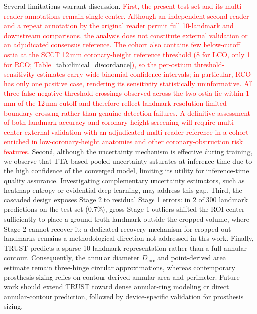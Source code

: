 \documentclass[conference]{IEEEtran}
\begin{document}
Several limitations warrant discussion. \textcolor{red}{First, the present test set and its multi-reader annotations remain single-center. Although an independent second reader and a repeat annotation by the original reader permit full 10-landmark and downstream comparisons, the analysis does not constitute external validation or an adjudicated consensus reference.} \textcolor{red}{The cohort also contains few below-cutoff ostia at the SCCT 12\,mm coronary-height reference threshold (8 for LCO, only 1 for RCO; Table~\ref{tab:clinical_discordance}), so the per-ostium threshold-sensitivity estimates carry wide binomial confidence intervals; in particular, RCO has only one positive case, rendering its sensitivity statistically uninformative. All three false-negative threshold crossings observed across the two ostia lie within 1\,mm of the 12\,mm cutoff and therefore reflect landmark-resolution-limited boundary crossing rather than genuine detection failures. A definitive assessment of both landmark accuracy and coronary-height screening will require multi-center external validation with an adjudicated multi-reader reference in a cohort enriched in low-coronary-height anatomies and other coronary-obstruction risk features.} Second, although the uncertainty mechanism is effective during training, we observe that TTA-based pooled uncertainty saturates at inference time due to the high confidence of the converged model, limiting its utility for inference-time quality assurance. Investigating complementary uncertainty estimators, such as heatmap entropy or evidential deep learning, may address this gap. Third, the cascaded design exposes Stage 2 to residual Stage 1 errors: in 2 of 300 landmark predictions on the test set (0.7\%), gross Stage 1 outliers shifted the ROI center sufficiently to place a ground-truth landmark outside the cropped volume, where Stage 2 cannot recover it; a dedicated recovery mechanism for cropped-out landmarks remains a methodological direction not addressed in this work. Finally, TRUST predicts a sparse 10-landmark representation rather than a full annular contour. Consequently, the annular diameter $D_{\text{circ}}$ and point-derived area estimate remain three-hinge circular approximations, whereas contemporary prosthesis sizing relies on contour-derived annular area and perimeter. Future work should extend TRUST toward dense annular-ring modeling or direct annular-contour prediction, followed by device-specific validation for prosthesis sizing.

\end{document}
